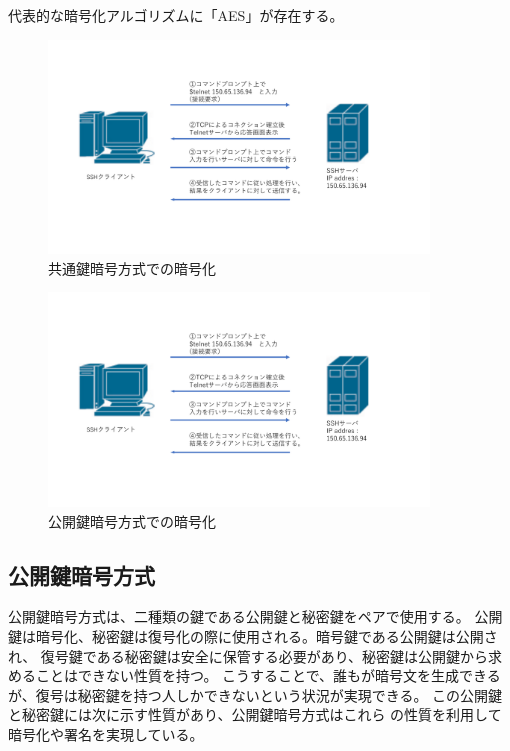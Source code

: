 \documentclass[11pt,a4j,titlepage]{jreport}
\begin{document}
代表的な暗号化アルゴリズムに「AES」が存在する。

\afterpage{\clearpage}
\newpage

\begin{figure}[h]
    \centering
    \includegraphics[width=0.9\textwidth, page=8]{graphs/network_archtecture.pdf}
    \caption{共通鍵暗号方式での暗号化}
    \label{shared_key}
\end{figure}

\begin{figure}[h]
    \centering
    \includegraphics[width=0.9\textwidth, page=9]{graphs/network_archtecture.pdf}
    \caption{公開鍵暗号方式での暗号化}
    \label{public_key}
\end{figure}


\afterpage{\clearpage}
\newpage
\subsection{公開鍵暗号方式}
公開鍵暗号方式は、二種類の鍵である公開鍵と秘密鍵をペアで使用する。
公開鍵は暗号化、秘密鍵は復号化の際に使用される。暗号鍵である公開鍵は公開され、
復号鍵である秘密鍵は安全に保管する必要があり、秘密鍵は公開鍵から求めることはできない性質を持つ。
こうすることで、誰もが暗号文を生成できるが、復号は秘密鍵を持つ人しかできないという状況が実現できる。
この公開鍵と秘密鍵には次に示す性質があり、公開鍵暗号方式はこれら
の性質を利用して暗号化や署名を実現している。
\end{document}
